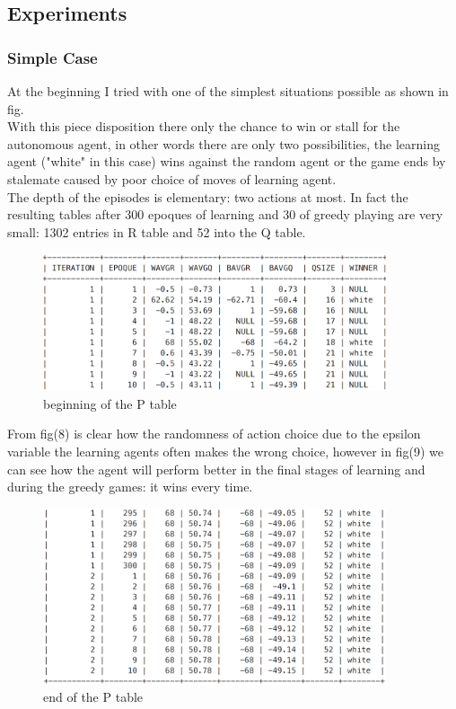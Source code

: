 \documentclass{article}
\begin{document}
			\subsection{Experiments}
				\subsubsection{Simple Case}
				At the beginning I tried with one of the simplest situations possible as shown in fig. \medskip\\
				With this piece disposition there only the chance to win or stall for the autonomous agent, in other words there are only two possibilities, the learning agent ("white" in this case) wins against the random agent or the game ends by stalemate caused by poor choice of moves of learning agent.\medskip\\
				The depth of the episodes is elementary: two actions at most. In fact the resulting tables after 300 epoques of learning and 30 of greedy playing are very small: 1302 entries in R table and 52 into the Q table.\medskip\\

				\newpage

				\begin{center}	
\begin{figure}[h]
\centering
\includegraphics[width=0.9\textwidth]{simple_ptable_ini}
\caption{beginning of the P table}
\label{fig:8}
\end{figure}
\end{center}
\medskip
				From fig(8) is clear how the randomness of action choice due to the epsilon variable the learning agents often makes the wrong choice, however in fig(9) we can see how the agent will perform better in the final stages of learning and during the greedy games: it wins every time.\medskip\\
				\begin{center}	
\begin{figure}[h]
\centering
\includegraphics[width=0.9\textwidth]{simple_ptable_fin}
\caption{end of the P table}
\label{fig:9}
\end{figure}
\end{center}
\end{document}
